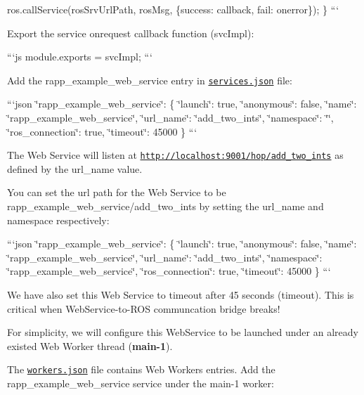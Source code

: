 ros.\-call\-Service(ros\-Srv\-Url\-Path, ros\-Msg, \{success\-: callback, fail\-: onerror\}); \} ```

Export the service onrequest callback function (svc\-Impl)\-:

```js module.\-exports = svc\-Impl; ```

Add the {\ttfamily rapp\-\_\-example\-\_\-web\-\_\-service} entry in \href{https://github.com/rapp-project/rapp-platform/blob/master/rapp_web_services/config/services/services.json}{\tt services.\-json} file\-:

```json \char`\"{}rapp\-\_\-example\-\_\-web\-\_\-service\char`\"{}\-: \{ \char`\"{}launch\char`\"{}\-: true, \char`\"{}anonymous\char`\"{}\-: false, \char`\"{}name\char`\"{}\-: \char`\"{}rapp\-\_\-example\-\_\-web\-\_\-service\char`\"{}, \char`\"{}url\-\_\-name\char`\"{}\-: \char`\"{}add\-\_\-two\-\_\-ints\char`\"{}, \char`\"{}namespace\char`\"{}\-: \char`\"{}\char`\"{}, \char`\"{}ros\-\_\-connection\char`\"{}\-: true, \char`\"{}timeout\char`\"{}\-: 45000 \} ```

The Web Service will listen at {\ttfamily \href{http://localhost:9001/hop/add_two_ints}{\tt http\-://localhost\-:9001/hop/add\-\_\-two\-\_\-ints}} as defined by the {\ttfamily url\-\_\-name} value.

You can set the url path for the Web Service to be {\ttfamily rapp\-\_\-example\-\_\-web\-\_\-service/add\-\_\-two\-\_\-ints} by setting the url\-\_\-name and namespace respectively\-:

```json \char`\"{}rapp\-\_\-example\-\_\-web\-\_\-service\char`\"{}\-: \{ \char`\"{}launch\char`\"{}\-: true, \char`\"{}anonymous\char`\"{}\-: false, \char`\"{}name\char`\"{}\-: \char`\"{}rapp\-\_\-example\-\_\-web\-\_\-service\char`\"{}, \char`\"{}url\-\_\-name\char`\"{}\-: \char`\"{}add\-\_\-two\-\_\-ints\char`\"{}, \char`\"{}namespace\char`\"{}\-: \char`\"{}rapp\-\_\-example\-\_\-web\-\_\-service\char`\"{}, \char`\"{}ros\-\_\-connection\char`\"{}\-: true, \char`\"{}timeout\char`\"{}\-: 45000 \} ```

We have also set this Web Service to timeout after 45 seconds ({\ttfamily timeout}). This is critical when Web\-Service-\/to-\/\-R\-O\-S communcation bridge breaks!

For simplicity, we will configure this Web\-Service to be launched under an already existed Web Worker thread ({\bfseries main-\/1}).

The \href{https://github.com/rapp-project/rapp-platform/blob/master/rapp_web_services/config/services/workers.json}{\tt workers.\-json} file contains Web Workers entries. Add the {\ttfamily rapp\-\_\-example\-\_\-web\-\_\-service} service under the {\ttfamily main-\/1} worker\-:

